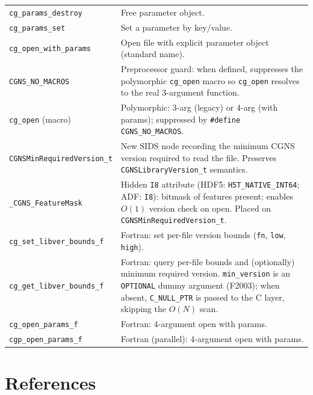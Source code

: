 \documentclass[11pt,letterpaper]{article}
\begin{document}
\begin{center}
\begin{longtable}{l p{8.5cm}}
\texttt{cg\_params\_destroy}    & Free parameter object. \\
\texttt{cg\_params\_set}        & Set a parameter by key/value. \\
\texttt{cg\_open\_with\_params} & Open file with explicit parameter object (standard name). \\
\texttt{CGNS\_NO\_MACROS}      & Preprocessor guard: when defined, suppresses the polymorphic \texttt{cg\_open} macro so \texttt{cg\_open} resolves to the real 3-argument function. \\
\texttt{cg\_open} (macro)       & Polymorphic: 3-arg (legacy) or 4-arg (with params); suppressed by \texttt{\#define CGNS\_NO\_MACROS}. \\
\texttt{CGNSMinRequiredVersion\_t} & New SIDS node recording the minimum CGNS version required to read the file.  Preserves \texttt{CGNSLibraryVersion\_t} semantics. \\
\texttt{\_CGNS\_FeatureMask}   & Hidden \texttt{I8} attribute (HDF5: \texttt{H5T\_NATIVE\_INT64}; ADF: \texttt{I8}): bitmask of features present; enables $O(1)$ version check on open. Placed on \texttt{CGNSMinRequiredVersion\_t}. \\
\texttt{cg\_set\_libver\_bounds\_f} & Fortran: set per-file version bounds (\texttt{fn}, \texttt{low}, \texttt{high}). \\
\texttt{cg\_get\_libver\_bounds\_f} & Fortran: query per-file bounds and (optionally) minimum required version.  \texttt{min\_version} is an \texttt{OPTIONAL} dummy argument (F2003); when absent, \texttt{C\_NULL\_PTR} is passed to the C layer, skipping the $O(N)$ scan. \\
\texttt{cg\_open\_params\_f}    & Fortran: 4-argument open with params. \\
\texttt{cgp\_open\_params\_f}   & Fortran (parallel): 4-argument open with params. \\
\bottomrule
\end{longtable}
\end{center}

\section{References}
\end{document}
